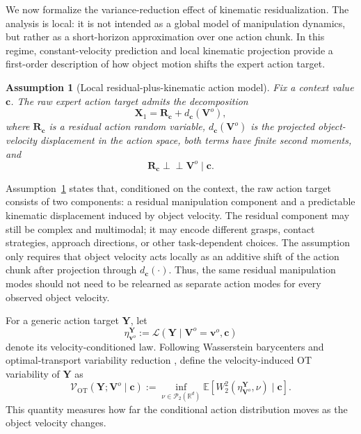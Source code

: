 \documentclass[10pt,twocolumn,letterpaper]{article}
\newtheorem{assumption}{Assumption}
\begin{document}
We now formalize the variance-reduction effect of kinematic residualization.
The analysis is local: it is not intended as a global model of manipulation
dynamics, but rather as a short-horizon approximation over one action chunk. In
this regime, constant-velocity prediction and local kinematic projection provide
a first-order description of how object motion shifts the expert action target.

\begin{assumption}[Local residual-plus-kinematic action model]
\label{ass:local_residual_kinematic_model}
Fix a context value $\mathbf c$. The raw expert action target admits the
decomposition
\begin{equation}
    \mathbf X_1
    =
    \mathbf R_{\mathbf c}
    +
    d_{\mathbf c}(\mathbf V^{o}),
    \label{eq:local_residual_kinematic_model}
\end{equation}
where $\mathbf R_{\mathbf c}$ is a residual action random variable,
$d_{\mathbf c}(\mathbf V^{o})$ is the projected object-velocity displacement in
the action space, both terms have finite second moments, and
\[
    \mathbf R_{\mathbf c}
    \perp\!\!\!\perp
    \mathbf V^{o}
    \mid
    \mathbf c.
\]
\end{assumption}

Assumption~\ref{ass:local_residual_kinematic_model} states that, conditioned on
the context, the raw action target consists of two components: a residual
manipulation component and a predictable kinematic displacement induced by
object velocity. The residual component may still be complex and multimodal; it
may encode different grasps, contact strategies, approach directions, or other
task-dependent choices. The assumption only requires that object velocity acts
locally as an additive shift of the action chunk after projection through
$d_{\mathbf c}(\cdot)$. Thus, the same residual manipulation modes should not
need to be relearned as separate action modes for every observed object
velocity.

For a generic action target $\mathbf Y$, let
\[
    \eta_{\mathbf v^{o}}^{\mathbf Y}
    :=
    \mathcal L(\mathbf Y \mid \mathbf V^{o}=\mathbf v^{o},\mathbf c)
\]
denote its velocity-conditioned law. Following Wasserstein barycenters and
optimal-transport variability reduction
\citep{agueh2011barycenters,villani2009optimal,hung2022variability}, define the
velocity-induced OT variability of $\mathbf Y$ as
\begin{equation}
    \mathcal V_{\mathrm{OT}}(\mathbf Y;\mathbf V^{o}\mid\mathbf c)
    :=
    \inf_{\nu\in\mathcal P_2(\mathbb R^d)}
    \mathbb E
    \left[
        W_2^2
        \left(
            \eta_{\mathbf V^{o}}^{\mathbf Y},
            \nu
        \right)
        \mid \mathbf c
    \right].
    \label{eq:velocity_ot_variability}
\end{equation}
This quantity measures how far the conditional action distribution moves as the
object velocity changes.
\end{document}
